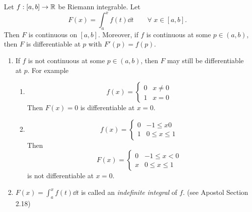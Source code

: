 \begin{thm} \label{thm:integration:IFTOC}
    Let $f : [a, b] \to \mathbb{R}$ be Riemann integrable. Let \[
        F(x) = \int_{a}^{x} f(t) \dd t \qquad \forall\; x \in [a, b].
    \] Then $F$ is continuous on $[a, b]$. Moreover, if $f$ is continuous at some $p \in (a, b)$, then $F$ is differentiable at $p$ with $F'(p) = f(p)$.
\end{thm}
\begin{rem} \leavevmode
    \begin{enumerate}[label=(\alph*)]
        \item If $f$ is not continuous at some $p \in (a, b)$, then $F$ may still be differentiable at $p$. For example 
        \begin{enumerate}[label=(\roman*)]
            \item \[
                f(x) = \begin{cases}
                    0 & x \neq 0 \\
                    1 & x = 0
                \end{cases}
            \] Then $F(x) = 0$ is differentiable at $x = 0$.
            \item \[
                f(x) = \begin{cases}
                    0 & -1 \leq x  0 \\
                    1 & 0 \leq x \leq 1
                \end{cases}
            \] Then \[
                F(x) = \begin{cases}
                    0 & -1 \leq x < 0 \\
                    x & 0 \leq x \leq 1
                \end{cases}
            \] is not differentiable at $x = 0$.
        \end{enumerate}

        \item $F(x) = \int_{a}^{x} f(t) \dd t$ is called an \emph{indefinite integral} of $f$. (see Apostol Section 2.18) 
    \end{enumerate}
\end{rem}

